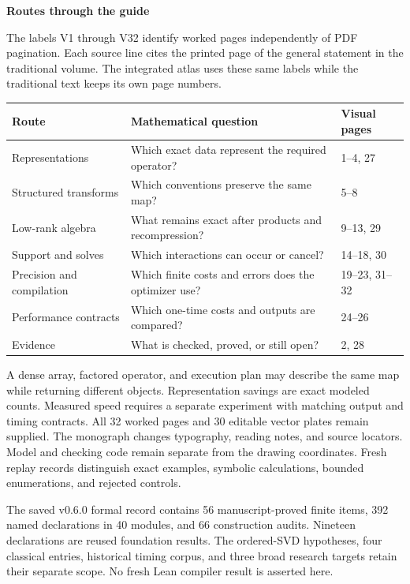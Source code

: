 {\sffamily\bfseries\Large\color{accent}Routes through the guide\par}\vspace{12pt}
The labels V1 through V32 identify worked pages independently of PDF pagination. Each source line cites the printed page of the general statement in the traditional volume. The integrated atlas uses these same labels while the traditional text keeps its own page numbers.
\begin{center}\small
\begin{tabularx}{\linewidth}{@{}p{1.55in}Yl@{}}\toprule
Route & Mathematical question & Visual pages\\\midrule
Representations & Which exact data represent the required operator? & 1--4, 27\\
Structured transforms & Which conventions preserve the same map? & 5--8\\
Low-rank algebra & What remains exact after products and recompression? & 9--13, 29\\
Support and solves & Which interactions can occur or cancel? & 14--18, 30\\
Precision and compilation & Which finite costs and errors does the optimizer use? & 19--23, 31--32\\
Performance contracts & Which one-time costs and outputs are compared? & 24--26\\
Evidence & What is checked, proved, or still open? & 2, 28\\\bottomrule
\end{tabularx}
\end{center}
A dense array, factored operator, and execution plan may describe the same map while returning different objects. Representation savings are exact modeled counts. Measured speed requires a separate experiment with matching output and timing contracts.
All 32 worked pages and 30 editable vector plates remain supplied. The monograph changes typography, reading notes, and source locators. Model and checking code remain separate from the drawing coordinates. Fresh replay records distinguish exact examples, symbolic calculations, bounded enumerations, and rejected controls.

The saved v0.6.0 formal record contains 56 manuscript-proved finite items, 392 named declarations in 40 modules, and 66 construction audits. Nineteen declarations are reused foundation results. The ordered-SVD hypotheses, four classical entries, historical timing corpus, and three broad research targets retain their separate scope. No fresh Lean compiler result is asserted here.
